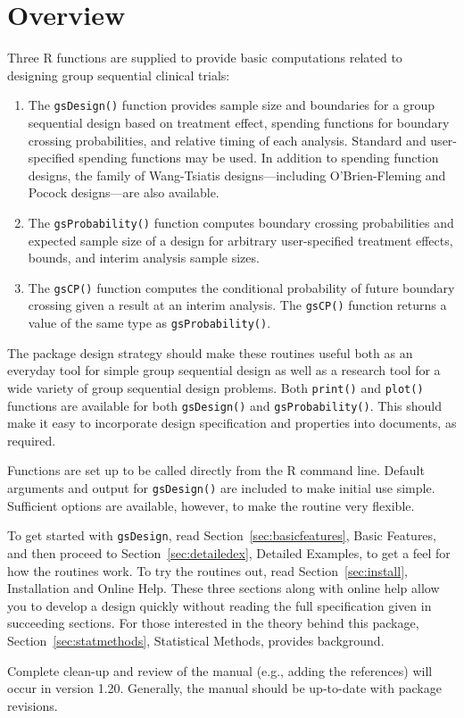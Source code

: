 \section{Overview}

Three R functions are supplied to provide basic computations related to
designing group sequential clinical trials:

\begin{enumerate}
\item The \texttt{gsDesign()} function provides sample size and
boundaries for a group sequential design based on treatment effect, spending
functions for boundary crossing probabilities, and relative timing of each
analysis. Standard and user-specified spending functions may be used. In
addition to spending function designs, the family of Wang-Tsiatis
designs---including O'Brien-Fleming and Pocock designs---are also available.

\item The \texttt{gsProbability()} function computes boundary crossing 
probabilities and expected sample size of a design for arbitrary 
user-specified treatment effects, bounds, and interim analysis sample sizes.

\item The \texttt{gsCP()} function computes the conditional probability of 
future boundary crossing given a result at an interim analysis. 
The \texttt{gsCP()} function returns a value of the same type as 
\texttt{gsProbability()}.
\end{enumerate}

The package design strategy should make these routines useful both as an
everyday tool for simple group sequential design as well as a research tool
for a wide variety of group sequential design problems. Both \texttt{print()}
and \texttt{plot()} functions are available for both \texttt{gsDesign()} and
\texttt{gsProbability()}. This should make it easy to incorporate design
specification and properties into documents, as required.

Functions are set up to be called directly from the R command line. Default
arguments and output for \texttt{gsDesign()} are included to make initial use
simple. Sufficient options are available, however, to make the routine very
flexible. 

To get started with \texttt{gsDesign}, read Section~\ref{sec:basicfeatures}, 
Basic Features,  and then proceed to Section~\ref{sec:detailedex}, Detailed 
Examples, to get a feel for how the routines work. To try the routines out, 
read Section~\ref{sec:install}, Installation and Online Help. These three
sections along with online help allow you to develop a design
quickly without reading the full specification given in succeeding sections.
For those interested in the theory behind this package, 
Section~\ref{sec:statmethods}, Statistical Methods, provides background.

Complete clean-up and review of the manual (e.g., adding the references) will
occur in version 1.20. Generally, the manual should be up-to-date with package revisions.

